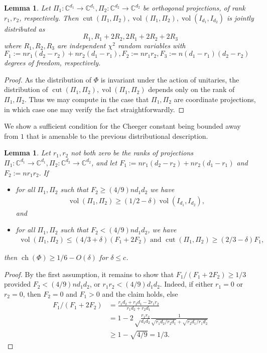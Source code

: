 \documentclass[aos]{imsart}
\newtheorem{lemma}[theorem]{Lemma}
\theoremstyle{definition}
\DeclareMathOperator{\vol}{vol}
\DeclareMathOperator{\cut}{cut}
\DeclareMathOperator{\ch}{ch}
\newcommand{\C}{{\mathbb{C}}}
\begin{document}
\begin{appendix}
\begin{lemma}\label{fact:chi} Let $\Pi_1:\C^{d_1} \to \C^{d_1}, \Pi_2: \C^{d_2} \to \C^{d_2}$ be orthogonal projections, of rank $r_1, r_2$, respectively. Then $\cut(\Pi_1, \Pi_2), \vol(\Pi_1, \Pi_2), \vol(I_{d_1}, I_{d_2})$ is jointly distributed as
$$ R_1, R_1 + 2R_2, 2R_1 + 2 R_2 + 2R_3$$ where
$R_1, R_2, R_3$ are independent $\chi^2$ random variables with $F_1:=n r_1(d_2 - r_2) + n r_2(d_1-r_1), F_2:= n r_1r_2, F_3:= n(d_1 - r_1)(d_2 - r_2)$ degrees of freedom, respectively.
\end{lemma}
\begin{proof} As the distribution of $\Phi$ is invariant under the action of unitaries, the distribution of $\cut(\Pi_1, \Pi_2), \vol(\Pi_1, \Pi_2)$ depends only on the rank of $\Pi_1, \Pi_2$. Thus we may compute in the case that $\Pi_1, \Pi_2$ are coordinate projections, in which case one may verify the fact straightforwardly.
\end{proof}


 We show a sufficient condition for the Cheeger constant being bounded away from $1$ that is amenable to the previous distributional description.
\begin{lemma}\label{lem:suff}
Let $r_1, r_2$ not both zero be the ranks of projections $\Pi_1: \C^{d_1} \to \C^{d_1}, \Pi_2: \C^{d_2} \to \C^{d_2}$, and let $F_1:= n r_1(d_2 - r_2) + n r_2(d_1-r_1)$ and $F_2:=n r_1r_2.$ If
\begin{itemize}
\item for all $\Pi_1, \Pi_2$ such that $F_2 \geq (4/9) n d_1 d_2$ we have
\begin{gather}\vol(\Pi_1, \Pi_2) \geq (1/2 - \delta) \vol(I_{d_1}, I_{d_2}),\label{eq:vol}\end{gather} and
\item for all $\Pi_1, \Pi_2$ such that $F_2 < (4/9) n d_1 d_2$, we have
\begin{gather} \vol(\Pi_1, \Pi_2) \leq (4/3 + \delta)(F_1 + 2 F_2) \textrm{ and } \cut(\Pi_1, \Pi_2) \geq (2/3 - \delta) F_1,\label{eq:cut} \end{gather}
\end{itemize}
then $\ch(\Phi) \geq 1/6 - O(\delta)$ for $\delta \leq c$.
\end{lemma}
\begin{proof} By the first assumption, it remains to show that $F_1/(F_1 + 2 F_2) \geq 1/3$ provided $F_2 < (4/9) n d_1 d_2$, or $r_1 r_2 < (4/9) d_1 d_2$. Indeed, if either $r_1 = 0$ or $r_2 = 0$, then $F_2 = 0$ and $F_1>0$ and the claim holds, else
\begin{align*}F_1/(F_1 + 2 F_2) &= \frac{r_1 d_2 + r_2 d_1 - 2 r_1 r_2}{r_1 d_2 + r_2 d_1}\\
 &= 1 -2 \sqrt\frac{ r_1 r_2}{d_1 d_2} \frac{1}{ \sqrt{ r_1 d_2/r_2 d_1} + \sqrt{r_2 d_1/ r_1 d_2}} \\
 &\geq 1 - \sqrt{4/9} = 1/3.
\end{align*}


\end{proof}
\end{appendix}
\end{document}
